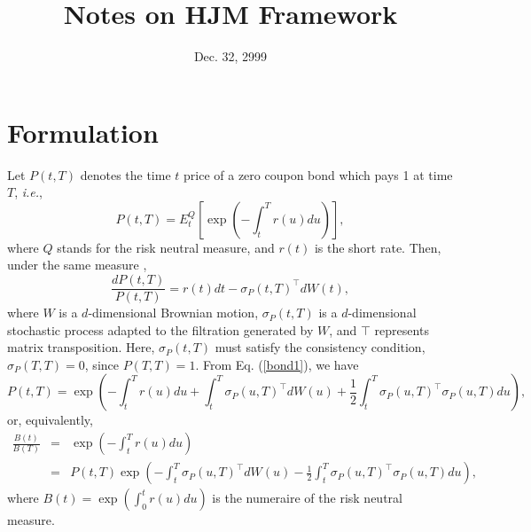 \documentclass[12pt]{article}
\begin{document}
\title{Notes on HJM Framework}
\date{Dec. 32, 2999}

\maketitle

\section{Formulation}

  Let $P(t,T)$ denotes the time $t$ price of a zero coupon bond which pays 1 at time $T$, {\it i.e.},
  \begin{equation}
    P(t,T)=E_t^Q\left[\exp\left(-\int_t^T r(u)du\right)\right],
    \label{bond0}
  \end{equation}
  where $Q$ stands for the risk neutral measure, and $r(t)$ is the short rate. Then, under the same measure \cite{AP},
  \begin{equation}
    \label{bond1}
    \frac{dP(t,T)}{P(t,T)}=r(t)dt-\sigma_P(t,T)^{{\top}}dW(t),
  \end{equation}
  where $W$ is a $d$-dimensional Brownian motion, $\sigma_P(t,T)$ is a
  $d$-dimensional stochastic process adapted to the filtration generated by $W$,
  and $\top$ represents matrix transposition. Here, $\sigma_P(t,T)$ must
  satisfy the consistency condition, $\sigma_P(T,T)=0$, since $P(T,T)=1$. From Eq. (\ref{bond1}), we have
  \begin{equation}
    \label{bond10}
    P(t,T)=\exp\left(-\int_t^Tr(u)du+\int_t^T\sigma_P(u,T)^{{\top}}dW(u)
                     +\frac{1}{2}\int_t^T\sigma_P(u,T)^{{\top}}\sigma_P(u,T)du\right),
  \end{equation}
  or, equivalently,
  \begin{eqnarray}
    \label{bond10}
    \frac{B(t)}{B(T)}&=&\exp\left(-\int_t^Tr(u)du\right)\nonumber\\
                     &=&P(t,T)\exp\left(-\int_t^T\sigma_P(u,T)^{{\top}}dW(u)
                     -\frac{1}{2}\int_t^T\sigma_P(u,T)^{{\top}}\sigma_P(u,T)du\right),
  \end{eqnarray}
  where $B(t)=\exp\left(\int_0^tr(u)du\right)$ is the numeraire of the risk neutral measure.
\end{document}
